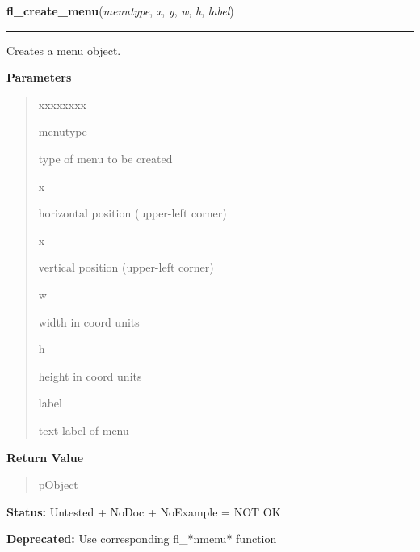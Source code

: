     \label{xformslib:library:fl_create_menu}

    \vspace{0.5ex}

\hspace{.8\funcindent}\begin{boxedminipage}{\funcwidth}

    \raggedright \textbf{fl\_create\_menu}(\textit{menutype}, \textit{x}, \textit{y}, \textit{w}, \textit{h}, \textit{label})

    \vspace{-1.5ex}

    \rule{\textwidth}{0.5\fboxrule}
\setlength{\parskip}{2ex}
    Creates a menu object.

\setlength{\parskip}{1ex}
      \textbf{Parameters}
      \vspace{-1ex}

      \begin{quote}
        \begin{Ventry}{xxxxxxxx}

          \item[menutype]

          type of menu to be created

          \item[x]

          horizontal position (upper-left corner)

          \item[x]

          vertical position (upper-left corner)

          \item[w]

          width in coord units

          \item[h]

          height in coord units

          \item[label]

          text label of menu

        \end{Ventry}

      \end{quote}

      \textbf{Return Value}
    \vspace{-1ex}

      \begin{quote}
      pObject

      \end{quote}

\textbf{Status:} Untested + NoDoc + NoExample = NOT OK



\textbf{Deprecated:} Use corresponding fl\_*nmenu* function



    \end{boxedminipage}

